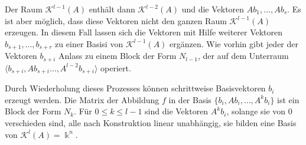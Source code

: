 Der Raum $\mathcal{K}^{l-1}(A)$ enthält dann $\mathcal{K}^{l-2}(A)$ und
die Vektoren $Ab_1,\dots,Ab_s$.
Es ist aber möglich, dass diese Vektoren nicht den ganzen Raum
$\mathcal{K}^{l-1}(A)$ erzeugen.
In diesem Fall lassen sich die Vektoren mit Hilfe weiterer Vektoren
$b_{s+1},\dots,b_{s+r}$ zu einer Basisi von $\mathcal{K}^{l-1}(A)$
ergänzen.
Wie vorhin gibt jeder der Vektoren $b_{s+i}$ Anlass zu einem Block
der Form $N_{l-1}$, der auf dem Unterraum
$\langle b_{s+i},Ab_{s+i}\dots,A^{l-2}b_{s+i}\rangle$
operiert.

Durch Wiederholung dieses Prozesses können schrittweise Basisvektoren
$b_i$ erzeugt werden.
Die Matrix der Abbildung $f$ in der Basis $\{b_i,Ab_i,\dots,A^kb_i\}$
ist ein Block der Form $N_k$.
Für $0\le k\le l-1$ sind die Vektoren $A^kb_i$,
solange sie von $0$ verschieden sind,
alle nach Konstruktion linear unabhängig, sie bilden eine Basis
von $\mathcal{K}^l(A)=\Bbbk^n$.

